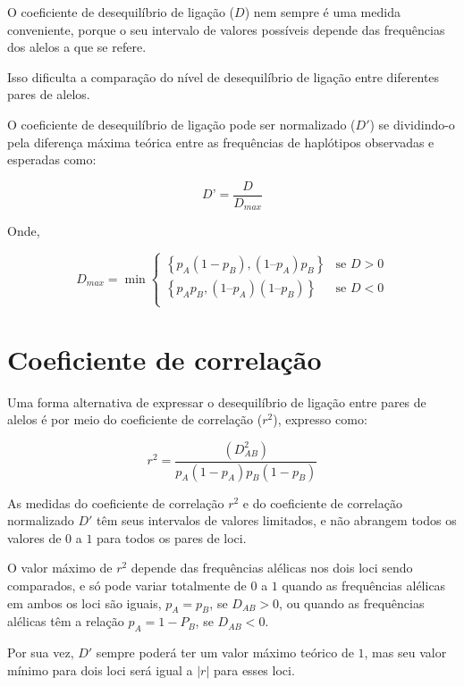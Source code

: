 \documentclass[
]{book}
\begin{document}
O coeficiente de desequilíbrio de ligação (\(D\)) nem sempre é uma medida conveniente, porque o seu intervalo de valores possíveis depende das frequências dos alelos a que se refere.

Isso dificulta a comparação do nível de desequilíbrio de ligação entre diferentes pares de alelos.

O coeficiente de desequilíbrio de ligação pode ser normalizado (\(D'\)) se dividindo-o pela diferença máxima teórica entre as frequências de haplótipos observadas e esperadas como:

\begin{equation}
D’ = \frac{D}{D_{max}}
\label{eq:dnorm}
\end{equation}

Onde,

\begin{equation}
D_{max} = \min
\begin{cases} 
\left \{p_A(1-p_B) , (1 – p_A)p_B \right \} & \text{se } D > 0 \\
\left \{p_Ap_B , (1 – p_A)(1 – p_B) \right \} & \text{se } D < 0 \\
\end{cases}
\label{eq:dmax}
\end{equation}

\hypertarget{coeficiente-de-correlauxe7uxe3o}{%
\section{Coeficiente de correlação}\label{coeficiente-de-correlauxe7uxe3o}}

Uma forma alternativa de expressar o desequilíbrio de ligação entre pares de alelos é por meio do coeficiente de correlação (\(r^2\)), expresso como:

\[r^2 = \frac{(D_{AB}^2)}{p_A(1-p_A)p_B(1-p_B)}\]

As medidas do coeficiente de correlação \(r^2\) e do coeficiente de correlação normalizado \(D'\) têm seus intervalos de valores limitados, e não abrangem todos os valores de \(0\) a \(1\) para todos os pares de loci.

O valor máximo de \(r^2\) depende das frequências alélicas nos dois loci sendo comparados, e só pode variar totalmente de \(0\) a \(1\) quando as frequências alélicas em ambos os loci são iguais, \(p_A = p_B\), se \(D_{AB} > 0\), ou quando as frequências alélicas têm a relação \(p_{A}=1-P_{B}\), se \(D_{AB} < 0\).

Por sua vez, \(D'\) sempre poderá ter um valor máximo teórico de \(1\), mas seu valor mínimo para dois loci será igual a \(| r |\) para esses loci.
\end{document}
